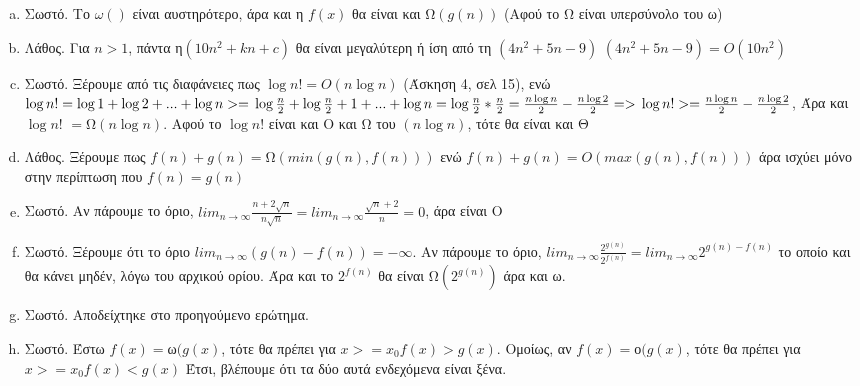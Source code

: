\documentclass{article}
\begin{document}
\begin{enumerate}[(a)]%
\item
Σωστό. Το $\omega{()}$ είναι αυστηρότερο, άρα και η $f(x)$ θα είναι και  Ω$(g(n))$ (Αφού το Ω είναι υπερσύνολο του ω)
\item
Λάθος. Για $n > 1$, πάντα η$(10n^2 + kn + c)$ θα είναι μεγαλύτερη ή ίση από τη $(4n^2 + 5n - 9)$ $(4n^2 + 5n - 9) = O(10n^2)$ 
\item
Σωστό. Ξέρουμε από τις διαφάνειες πως $\log{n!} = O(n\log{n})$ (Άσκηση 4, σελ 15), ενώ $\log{n!} = \log{1} + \log{2} + ... + \log{n} >= \\\\
 \log{\frac{n}{2}} + \log{\frac{n}{2}+1} + ... + \log{n} = \log{\frac{n}{2}}*\frac{n}{2} = \frac{n\log{n}}{2}-\frac{n\log{2}}{2} =>\\\\
\log{n!} >=  \frac{n\log{n}}{2}-\frac{n\log{2}}{2}$, Άρα και $\log{n!}$ $=$Ω$(n\log{n})$. Αφού  το $\log{n!}$ είναι και Ο και Ω του $(n\log{n})$, τότε θα είναι και Θ
\item
Λάθος. Ξέρουμε πως $f(n) + g(n) = $Ω$(min(g(n),f(n)))$ ενώ $f(n) + g(n) = O(max(g(n),f(n)))$ άρα ισχύει μόνο στην περίπτωση που $f(n) = g(n)$
\item
Σωστό. Αν πάρουμε το όριο, $ lim_{n\to\infty} \frac{n+2\sqrt{n}}{n\sqrt{n}} = lim_{n\to\infty} \frac{\sqrt{n}+2}{n} = 0$, άρα είναι O
\item
Σωστό. Ξέρουμε ότι το όριο $ lim_{n\to\infty} (g(n) - f(n)) = -\infty$. Αν πάρουμε το όριο, $ lim_{n\to\infty} \frac{2^{g(n)}}{2^{f(n)}} =  lim_{n\to\infty} 2^{g(n)-f(n)}$ το οποίο και θα κάνει μηδέν, λόγω του αρχικού ορίου. Άρα και το $2^{f(n)}$ θα είναι Ω$(2^{g(n)})$ άρα και ω.
\item
Σωστό. Αποδείχτηκε στο προηγούμενο ερώτημα.
\item
Σωστό. Έστω $f(x) = $ω$(g(x)$, τότε θα πρέπει για $x>=x_0 f(x) > g(x)$. Ομοίως, αν $f(x) = $ο$(g(x)$, τότε θα πρέπει για $x>=x_0 f(x) < g(x)$ Έτσι, βλέπουμε ότι τα δύο αυτά ενδεχόμενα είναι ξένα.

\end{enumerate}
\end{document}
